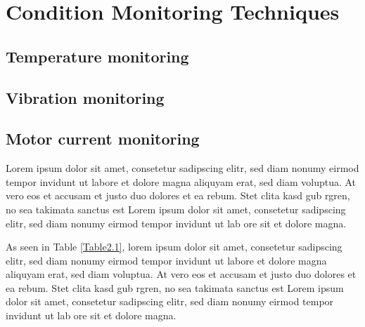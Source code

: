 \section{Condition Monitoring Techniques}

\subsection{Temperature monitoring}
\subsection{Vibration monitoring}
\subsection{Motor current monitoring}


Lorem ipsum dolor sit amet, consetetur sadipscing elitr, sed diam nonumy eirmod tempor invidunt ut labore et dolore magna aliquyam erat, sed diam voluptua. At vero eos et accusam et justo duo dolores et ea rebum. Stet clita kasd gub rgren, no sea takimata sanctus est Lorem ipsum dolor sit amet, consetetur sadipscing elitr, sed diam nonumy eirmod tempor invidunt ut lab ore sit et dolore magna.


As seen in Table \ref{Table2.1}, lorem ipsum dolor sit amet, consetetur sadipscing elitr, sed diam nonumy eirmod tempor invidunt ut labore et dolore magna aliquyam erat, sed diam voluptua. At vero eos et accusam et justo duo dolores et ea rebum. Stet clita kasd gub rgren, no sea takimata sanctus est Lorem ipsum dolor sit amet, consetetur sadipscing elitr, sed diam nonumy eirmod tempor invidunt ut lab ore sit et dolore magna.

